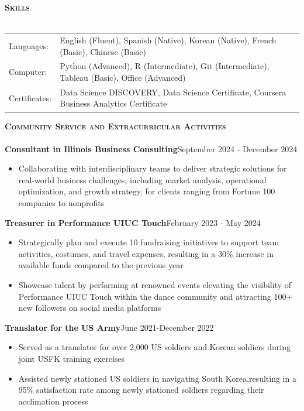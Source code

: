 \documentclass[a4paper]{article}
\newcommand{\lineunder} {
    \vspace*{-8pt} \\
    \hspace*{-18pt} \hrulefill \\
}
\newcommand{\header} [1] {
    {\hspace*{-18pt}\vspace*{6pt} \textsc{#1}}
    \vspace*{-6pt} \lineunder
}
\begin{document}
\vspace*{1mm}

\header{\textbf{Skills}}
\begin{tabular}{@{}l >{\raggedright\arraybackslash}p{}@{}}
    Languages: & English (Fluent), Spanish (Native), Korean (Native), French (Basic), Chinese (Basic) \\
    Computer: & Python (Advanced), R (Intermediate), Git (Intermediate), Tableau (Basic), Office (Advanced) \\
    Certificates: & Data Science DISCOVERY, Data Science Certificate, Coursera Business Analytics Certificate
\end{tabular}


\vspace{1mm}


\header{\textbf{Community Service and Extracurricular Activities}}

\textbf{Consultant in Illinois Business Consulting}\hfill{September 2024 - December 2024}
\begin{itemize}[nolistsep]
    \item Collaborating with interdisciplinary teams to deliver strategic solutions 
    for real-world business challenges, including market analysis, 
    operational optimization, and growth strategy, for clients ranging from Fortune 
    100 companies to nonprofits
\end{itemize} 

\textbf{Treasurer in Performance UIUC Touch}\hfill{February 2023 - May 2024}
\begin{itemize}[nolistsep]
    \item Strategically plan and execute 10 fundraising 
    initiatives to support team activities, costumes,
    and travel expenses, resulting in a 30\% 
    increase in available funds compared to the previous year
    \item Showcase talent by performing at renowned 
    events elevating the visibility of Performance 
    UIUC Touch within the dance community and attracting 100+ new followers 
    on social media platforms
\end{itemize}
\vspace*{1mm}

\textbf{Translator for the US Army}\hfill{June 2021-December 2022}
    \begin{itemize}[noitemsep]
        \item Served as a translator for over 2,000 US soldiers 
        and Korean soldiers during joint 
        USFK training exercises
        \item Assisted newly stationed US soldiers in navigating 
        South Korea,resulting in a 95\% satisfaction rate among newly 
        stationed soldiers regarding their acclimation process
    \end{itemize}
\end{document}
